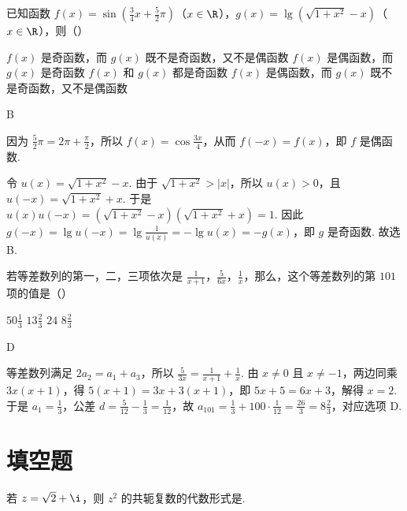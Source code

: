 \begin{problem}
已知函数 \(f(x)=\sin\left(\frac34x+\frac52\pi\right)\)（\(x\in\R\)），\(g(x)=\lg\left(\sqrt{1+x^{2}}-x\right)\)（\(x\in\R\)），则（\quad）

\choices
{\(f(x)\) 是奇函数，而 \(g(x)\) 既不是奇函数，又不是偶函数}
{\(f(x)\) 是偶函数，而 \(g(x)\) 是奇函数}
{\(f(x)\) 和 \(g(x)\) 都是奇函数}
{\(f(x)\) 是偶函数，而 \(g(x)\) 既不是奇函数，又不是偶函数}
\end{problem}

\begin{answer}B\end{answer}

\begin{solution}
因为 \(\frac52\pi=2\pi+\frac\pi2\)，所以 \(f(x)=\cos\frac{3x}{4}\)，从而 \(f(-x)=f(x)\)，即 \(f\) 是偶函数.

令 \(u(x)=\sqrt{1+x^{2}}-x\). 由于 \(\sqrt{1+x^{2}}>|x|\)，所以 \(u(x)>0\)，且 \(u(-x)=\sqrt{1+x^{2}}+x\). 于是 \(u(x)u(-x)=\left(\sqrt{1+x^{2}}-x\right)\left(\sqrt{1+x^{2}}+x\right)=1\). 因此 \(g(-x)=\lg u(-x)=\lg\frac1{u(x)}=-\lg u(x)=-g(x)\)，即 \(g\) 是奇函数. 故选 B.
\end{solution}

\begin{problem}
若等差数列的第一，二，三项依次是 \(\frac1{x+1}\)，\(\frac5{6x}\)，\(\frac1{x}\)，那么，这个等差数列的第 \(101\) 项的值是（\quad）

\choices
{\(50\frac13\)}
{\(13\frac23\)}
{\(24\)}
{\(8\frac23\)}
\end{problem}

\begin{answer}D\end{answer}

\begin{solution}
等差数列满足 \(2a_{2}=a_{1}+a_{3}\)，所以 \(\frac{5}{3x}=\frac1{x+1}+\frac1{x}\). 由 \(x\neq0\) 且 \(x\neq-1\)，两边同乘 \(3x(x+1)\)，得 \(5(x+1)=3x+3(x+1)\)，即 \(5x+5=6x+3\)，解得 \(x=2\). 于是 \(a_{1}=\frac13\)，公差 \(d=\frac{5}{12}-\frac13=\frac1{12}\)，故 \(a_{101}=\frac13+100\cdot\frac1{12}=\frac{26}{3}=8\frac23\)，对应选项 D.
\end{solution}

\section{填空题}

\begin{problem}
若 \(z=\sqrt2+\i\)，则 \(z^{2}\) 的共轭复数的代数形式是\fillinblank{}.
\end{problem}

